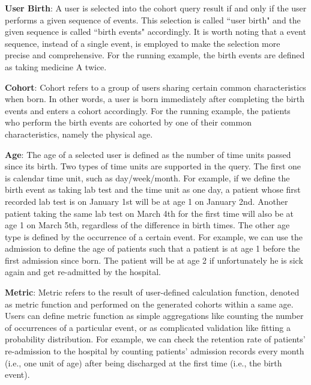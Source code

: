 \textbf{User Birth}: A user is selected into the cohort query result if and only if the user performs a given sequence of events. This selection is called ``user birth" and the given sequence is called ``birth events" accordingly. It is worth noting that a event sequence, instead of a single event, is employed to make the selection more precise and comprehensive.
For the running example, the birth events are defined as taking medicine A twice.

\textbf{Cohort}: Cohort refers to a group of users sharing certain common characteristics when born. In other words, a user is born immediately after completing the birth events and enters a cohort accordingly. For the running example, the patients who perform the birth events are cohorted by one of their common characteristics, namely the physical age.

\textbf{Age}: The age of a selected user is defined as the number of time units passed since its birth. Two types of time units are supported in the query. The first one is calendar time unit, such as day/week/month. For example, if we define the birth event as taking lab test and the time unit as one day, a patient whose first recorded lab test is on January 1st will be at age 1 on January 2nd. 
Another patient taking the same lab test on March 4th for the first time will also be at age 1 on March 5th, regardless of the difference in birth times. The other age type is defined by the occurrence of a certain event. For example, we can use the admission to define the age of patients such that a patient is at age 1 before the first admission since born.
The patient will be at age 2 if unfortunately he is sick again and get re-admitted by the hospital.


\textbf{Metric}: Metric refers to the result of user-defined calculation function, denoted as metric function and performed on the generated cohorts within a same age. Users can define metric function as simple aggregations like counting the number of occurrences of a particular event, or as complicated validation like fitting a probability distribution. For example, we can check the retention rate of patients' re-admission to the hospital by counting patients' admission records every month (i.e., one unit of age) after being discharged at the first time (i.e., the birth event).

